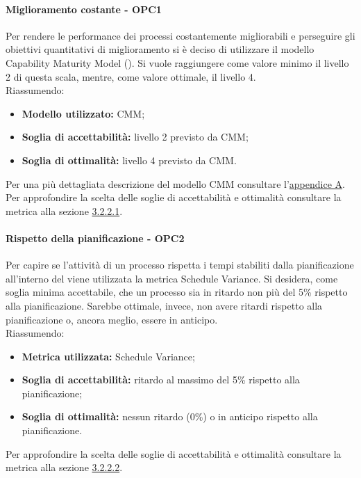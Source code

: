 \documentclass[PianoDiQualifica.tex]{subfiles}
\begin{document}
			\paragraph{Miglioramento costante - OPC1}
			Per rendere le performance dei processi costantemente migliorabili e perseguire gli obiettivi quantitativi di miglioramento si è deciso di utilizzare il modello Capability Maturity Model ().
			Si vuole raggiungere come valore minimo il livello 2 di questa scala, mentre, come valore ottimale, il livello 4. \\
			Riassumendo:
			\begin{itemize}
			\item \textbf{Modello utilizzato:} CMM;
			\item \textbf{Soglia di accettabilità:} livello 2 previsto da CMM;
			\item \textbf{Soglia di ottimalità:} livello 4 previsto da CMM.
			\end{itemize}
			Per una più dettagliata descrizione del modello CMM consultare l'\hyperlink{CMM_label}{appendice A}. \\
			Per approfondire la scelta delle soglie di accettabilità e ottimalità consultare la metrica alla sezione \hyperlink{CMM_m}{3.2.2.1}.

			\paragraph{Rispetto della pianificazione - OPC2}
			Per capire se l'attività di un processo rispetta i tempi stabiliti dalla pianificazione all'interno del \PPdocRR{} viene utilizzata la metrica Schedule Variance.
			Si desidera, come soglia minima accettabile, che un processo sia in ritardo non più del 5\% rispetto alla pianificazione. Sarebbe ottimale, invece, non avere ritardi
			rispetto alla pianificazione o, ancora meglio, essere in anticipo.\\
			Riassumendo:
			\begin{itemize}
			\item \textbf{Metrica utilizzata:} Schedule Variance;
			\item \textbf{Soglia di accettabilità:} ritardo al massimo del 5\% rispetto alla pianificazione;
			\item \textbf{Soglia di ottimalità:} nessun ritardo (0\%) o in anticipo rispetto alla pianificazione.
			\end{itemize}
			Per approfondire la scelta delle soglie di accettabilità e ottimalità consultare la metrica alla sezione \hyperlink{Schedule_m}{3.2.2.2}.
\end{document}

